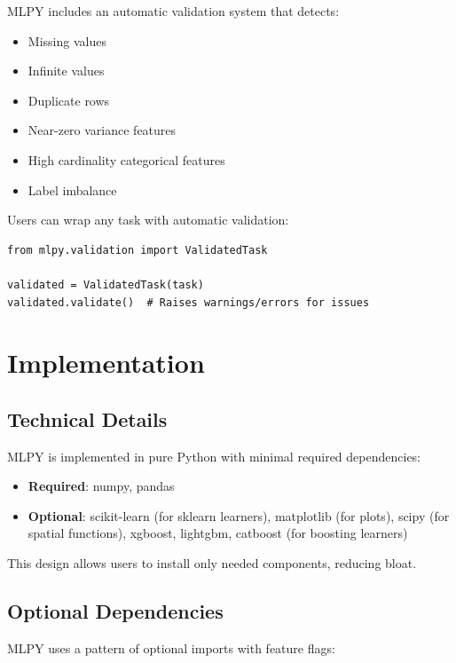 \documentclass[twoside,11pt]{article}
\begin{document}
MLPY includes an automatic validation system that detects:
\begin{itemize}
  \item Missing values
  \item Infinite values
  \item Duplicate rows
  \item Near-zero variance features
  \item High cardinality categorical features
  \item Label imbalance
\end{itemize}

Users can wrap any task with automatic validation:

\begin{lstlisting}
from mlpy.validation import ValidatedTask

validated = ValidatedTask(task)
validated.validate()  # Raises warnings/errors for issues
\end{lstlisting}

\section{Implementation}
\label{sec:implementation}

\subsection{Technical Details}

MLPY is implemented in pure Python with minimal required dependencies:
\begin{itemize}
  \item \textbf{Required}: numpy, pandas
  \item \textbf{Optional}: scikit-learn (for sklearn learners), matplotlib (for plots),
        scipy (for spatial functions), xgboost, lightgbm, catboost (for boosting learners)
\end{itemize}

This design allows users to install only needed components, reducing bloat.

\subsection{Optional Dependencies}

MLPY uses a pattern of optional imports with feature flags:
\end{document}
